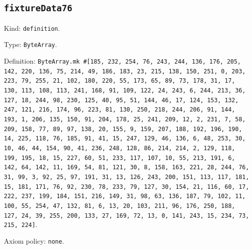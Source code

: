 \documentclass[11pt]{article}
\begin{document}
\subsection*{\texttt{fixtureData76}}
\noindent Kind: \texttt{definition}.\par
\noindent Type: \texttt{ByteArray}.\par
\noindent Definition: \texttt{ByteArray.mk \#[185, 232, 254, 76, 243, 244, 136, 176, 205, 142, 220, 136, 75, 214, 49, 186, 183, 23, 215, 138, 150, 251, 0, 203, 223, 79, 255, 21, 102, 180, 220, 55, 173, 65, 89, 73, 178, 31, 17, 130, 113, 108, 113, 241, 168, 91, 109, 122, 24, 243, 6, 244, 213, 36, 127, 18, 244, 98, 230, 125, 40, 95, 51, 144, 46, 17, 124, 153, 132, 247, 121, 216, 174, 96, 223, 81, 130, 250, 218, 244, 206, 91, 144, 193, 1, 206, 135, 150, 91, 204, 178, 25, 241, 209, 12, 2, 231, 7, 58, 209, 158, 77, 89, 97, 138, 20, 155, 9, 159, 207, 188, 192, 196, 190, 14, 225, 118, 76, 185, 91, 41, 15, 247, 129, 46, 136, 6, 48, 253, 30, 10, 46, 44, 154, 90, 41, 236, 248, 128, 86, 214, 214, 2, 129, 118, 199, 195, 18, 15, 227, 60, 51, 233, 117, 107, 10, 55, 213, 191, 6, 142, 64, 142, 11, 169, 54, 81, 121, 30, 8, 158, 163, 221, 28, 244, 76, 31, 99, 3, 92, 25, 97, 191, 31, 13, 126, 243, 200, 151, 113, 117, 181, 15, 181, 171, 76, 92, 230, 78, 233, 79, 127, 30, 154, 21, 116, 60, 17, 222, 237, 199, 184, 151, 216, 149, 31, 98, 63, 136, 187, 79, 102, 11, 100, 55, 254, 47, 132, 81, 6, 13, 20, 103, 211, 96, 176, 250, 188, 127, 24, 39, 255, 200, 133, 27, 169, 72, 13, 0, 141, 243, 15, 234, 73, 215, 224]}.\par
\noindent Axiom policy: \texttt{none}.\par
\end{document}
